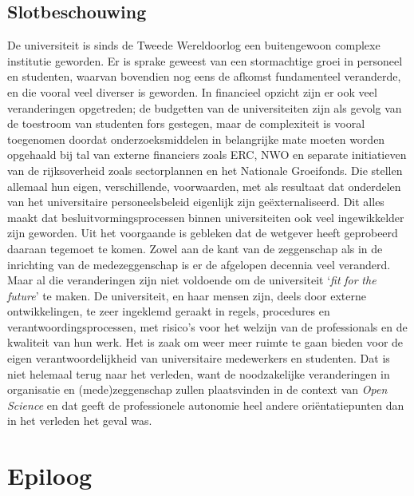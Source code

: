 \documentclass[smallauthor, chapterhaspagenum, nochapterinheader, pagenuminheader,  bigchapnum,medium2, tocpages,  garamond, titleinheader]{jote-book}
\begin{document}
	\section{Slotbeschouwing}



	De universiteit is sinds de Tweede Wereldoorlog een buitengewoon complexe institutie geworden. Er is sprake geweest van een stormachtige groei in personeel en studenten, waarvan bovendien nog eens de afkomst fundamenteel veranderde, en die vooral veel diverser is geworden. In financieel opzicht zijn er ook veel veranderingen opgetreden; de budgetten van de universiteiten zijn als gevolg van de toestroom van studenten fors gestegen, maar de complexiteit is vooral toegenomen doordat onderzoeksmiddelen in belangrijke mate moeten worden opgehaald bij tal van externe financiers zoals ERC, NWO en separate initiatieven van de rijksoverheid zoals sectorplannen en het Nationale Groeifonds. Die stellen allemaal hun eigen, verschillende, voorwaarden, met als resultaat dat onderdelen van het universitaire personeelsbeleid eigenlijk zijn geëxternaliseerd. Dit alles maakt dat besluitvormingsprocessen binnen universiteiten ook veel ingewikkelder zijn geworden. Uit het voorgaande is gebleken dat de wetgever heeft geprobeerd daaraan tegemoet te komen. Zowel aan de kant van de zeggenschap als in de inrichting van de medezeggenschap is er de afgelopen decennia veel veranderd. Maar al die veranderingen zijn niet voldoende om de universiteit ‘\emph{fit }\emph{for}\emph{ }\emph{the}\emph{ }\emph{future}' te maken. De universiteit, en haar mensen zijn, deels door externe ontwikkelingen, te zeer ingeklemd geraakt in regels, procedures en verantwoordingsprocessen, met risico's voor het welzijn van de professionals en de kwaliteit van hun werk. Het is zaak om weer meer ruimte te gaan bieden voor de eigen verantwoordelijkheid van universitaire medewerkers en studenten. Dat is niet helemaal terug naar het verleden, want de noodzakelijke veranderingen in organisatie en (mede)zeggenschap zullen plaatsvinden in de context van \emph{Open }\emph{Science} en dat geeft de professionele autonomie heel andere oriëntatiepunten dan in het verleden het geval was.






	\chapter*{Epiloog}
\end{document}
